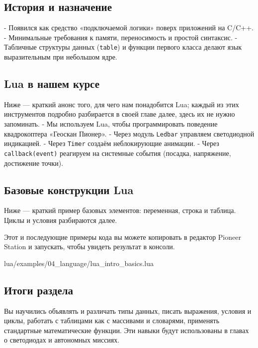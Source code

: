 \subsection{История и назначение}
- Появился как средство «подключаемой логики» поверх приложений на C/C++.
- Минимальные требования к памяти, переносимость и простой синтаксис.
- Табличные структуры данных (\verb|table|) и функции первого класса делают язык выразительным при небольшом ядре.

\subsection{Lua в нашем курсе}
Ниже — краткий анонс того, для чего нам понадобится Lua; каждый из этих инструментов подробно разбирается в своей главе далее, здесь их не нужно запоминать.
- Мы используем Lua, чтобы программировать поведение квадрокоптера «Геоскан Пионер».
- Через модуль \verb|Ledbar| управляем светодиодной индикацией.
- Через \verb|Timer| создаём неблокирующие анимации.
- Через \verb|callback(event)| реагируем на системные события (посадка, напряжение, достижение точки).

\subsection{Базовые конструкции Lua}
Ниже — краткий пример базовых элементов: переменная, строка и таблица. Циклы и условия разбираются далее.
\begin{infobox}[Практика]
    Этот и последующие примеры кода вы можете копировать в редактор Pioneer Station и запускать, чтобы увидеть результат в консоли.
\end{infobox}
\begin{codefile}{lua/examples/04_language/lua_intro_basics.lua}
\end{codefile}
\subsection*{Итоги раздела}
Вы научились объявлять и различать типы данных, писать выражения, условия и циклы, работать с таблицами как с массивами и словарями, применять стандартные математические функции. Эти навыки будут использованы в главах о светодиодах и автономных миссиях.
